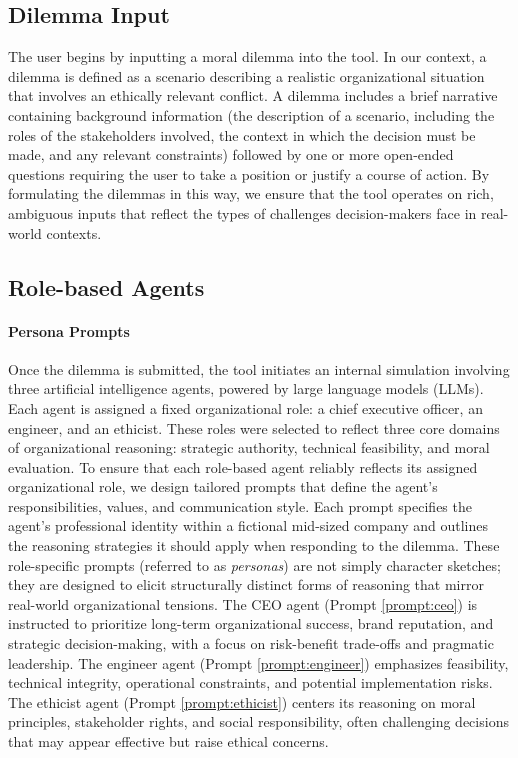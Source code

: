 \subsection{Dilemma Input}

The user begins by inputting a moral dilemma into the tool.
In our context, a dilemma is defined as a scenario describing a realistic organizational situation that involves an ethically relevant conflict. A dilemma includes a brief narrative containing background information (the description of a scenario, including the roles of the stakeholders involved, the context in which the decision must be made, and any relevant constraints) followed by one or more open-ended questions requiring the user to take a position or justify a course of action.
By formulating the dilemmas in this way, we ensure that the tool operates on rich, ambiguous inputs that reflect the types of challenges decision-makers face in real-world contexts.

\subsection{Role-based Agents}

\paragraph{Persona Prompts}{
  Once the dilemma is submitted, the tool initiates an internal simulation involving three artificial intelligence agents, powered by large language models (LLMs). Each agent is assigned a fixed organizational role: a chief executive officer, an engineer, and an ethicist. These roles were selected to reflect three core domains of organizational reasoning: strategic authority, technical feasibility, and moral evaluation.
  To ensure that each role-based agent reliably reflects its assigned organizational role, we design tailored prompts that define the agent's responsibilities, values, and communication style. Each prompt specifies the agent's professional identity within a fictional mid-sized company and outlines the reasoning strategies it should apply when responding to the dilemma.
  These role-specific prompts (referred to as \textit{personas}) are not simply character sketches; they are designed to elicit structurally distinct forms of reasoning that mirror real-world organizational tensions.
  The CEO agent (Prompt \ref{prompt:ceo}) is instructed to prioritize long-term organizational success, brand reputation, and strategic decision-making, with a focus on risk-benefit trade-offs and pragmatic leadership. The engineer agent (Prompt \ref{prompt:engineer}) emphasizes feasibility, technical integrity, operational constraints, and potential implementation risks. The ethicist agent (Prompt \ref{prompt:ethicist}) centers its reasoning on moral principles, stakeholder rights, and social responsibility, often challenging decisions that may appear effective but raise ethical concerns.
}

